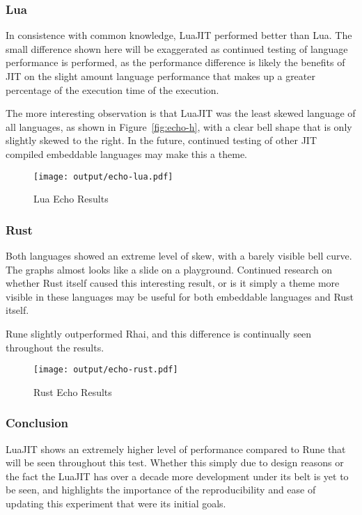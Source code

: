 \subsubsection{Lua}
In consistence with common knowledge, LuaJIT performed better than Lua. The small difference shown here will be exaggerated as continued testing of language performance is performed, as the performance difference is likely the benefits of JIT on the slight amount language performance that makes up a greater percentage of the execution time of the execution.

The more interesting observation is that LuaJIT was the least skewed language of all languages, as shown in Figure~\ref{fig:echo-h}, with a clear bell shape that is only slightly skewed to the right. In the future, continued testing of other JIT compiled embeddable languages may make this a theme.

\begin{figure}[H]
	\centering
		\texttt{[image: output/echo-lua.pdf]}
	\caption{Lua Echo Results}
	\label{fig:echo-lua}
\end{figure}

\subsubsection{Rust}
Both languages showed an extreme level of skew, with a barely visible bell curve. The graphs almost looks like a slide on a playground. Continued research on whether Rust itself caused this interesting result, or is it simply a theme more visible in these languages may be useful for both embeddable languages and Rust itself.

Rune slightly outperformed Rhai, and this difference is continually seen throughout the results. 

\begin{figure}[H]
	\centering
		\texttt{[image: output/echo-rust.pdf]}
	\caption{Rust Echo Results}
	\label{fig:echo-rust}
\end{figure}

\subsubsection{Conclusion}
LuaJIT shows an extremely higher level of performance compared to Rune that will be seen throughout this test. Whether this simply due to design reasons or the fact the LuaJIT has over a decade more development under its belt is yet to be seen, and highlights the importance of the reproducibility and ease of updating this experiment that were its initial goals.

